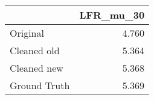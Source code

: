 \begin{tabular}{lr}
\toprule
{} & LFR_mu_30 \\
\midrule
Original     &     4.760 \\
Cleaned old  &     5.364 \\
Cleaned new  &     5.368 \\
Ground Truth &     5.369 \\
\bottomrule
\end{tabular}
